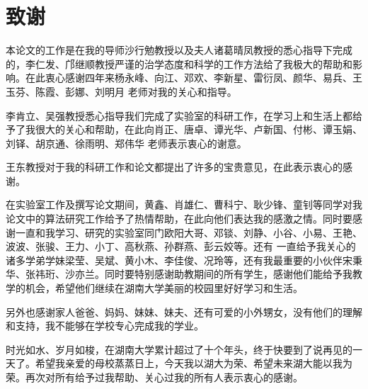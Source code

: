 \chapter*{致\quad 谢}

本论文的工作是在我的导师沙行勉教授以及夫人诸葛晴凤教授的悉心指导下完成的，李仁发、邝继顺教授严谨的治学态度和科学的工作方法给了我极大的帮助和影响。在此衷心感谢四年来杨永峰、向江、邓欢、李新星、雷衍凤、颜华、易兵、王玉芬、陈霞、彭娜、刘明月 老师对我的关心和指导。

李肯立、吴强教授悉心指导我们完成了实验室的科研工作，在学习上和生活上都给予了我很大的关心和帮助，在此向肖正、唐卓、谭光华、卢新国、付彬、谭玉娟、刘铎、胡京通、徐雨明、郑伟华 老师表示衷心的谢意。

王东教授对于我的科研工作和论文都提出了许多的宝贵意见，在此表示衷心的感谢。

在实验室工作及撰写论文期间，黄鑫、肖雄仁、曹科宁、耿少锋、童钊等同学对我论文中的算法研究工作给予了热情帮助，在此向他们表达我的感激之情。同时要感谢一直和我学习、研究的实验室同门欧阳大哥、邓锬、刘静、小谷、小易、王艳、波波、张骏、王力、小丁、高秋燕、孙群燕、彭云姣等。还有
一直给予我关心的诸多学弟学妹梁莹、吴斌、黄小木、李佳俊、况玲等，还有我最重要的小伙伴宋秉华、张祎珩、沙亦兰。同时要特别感谢助教期间的所有学生，感谢他们能给予我教学的机会，希望他们继续在湖南大学美丽的校园里好好学习和生活。

另外也感谢家人爸爸、妈妈、妹妹、妹夫、还有可爱的小外甥女，没有他们的理解和支持，我不能够在学校专心完成我的学业。

时光如水、岁月如梭，在湖南大学累计超过了十个年头，终于快要到了说再见的一天了。希望我亲爱的母校蒸蒸日上，今天我以湖大为荣、希望未来湖大能以我为荣。再次对所有给予过我帮助、关心过我的所有人表示衷心的感谢。



